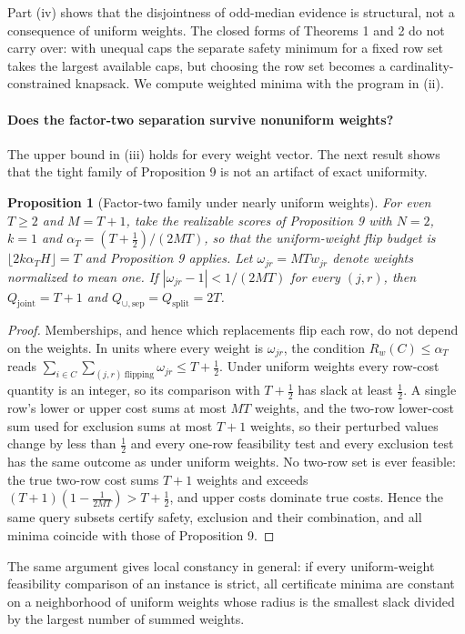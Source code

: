 \documentclass[11pt]{article}
\newtheorem{proposition}{Proposition}
\newcommand{\Qj}{Q_{\mathrm{joint}}}
\newcommand{\Qu}{Q_{\cup,\mathrm{sep}}}
\newcommand{\Qs}{Q_{\mathrm{split}}}
\begin{document}
Part (iv) shows that the disjointness of odd-median evidence is structural, not a consequence of uniform weights. The closed forms of Theorems 1 and 2 do not carry over: with unequal caps the separate safety minimum for a fixed row set takes the largest available caps, but choosing the row set becomes a cardinality-constrained knapsack. We compute weighted minima with the program in (ii).

\paragraph{Does the factor-two separation survive nonuniform weights?} The upper bound in (iii) holds for every weight vector. The next result shows that the tight family of Proposition 9 is not an artifact of exact uniformity.

\begin{proposition}[Factor-two family under nearly uniform weights]
\label{prop:perturb}
For even $T\ge2$ and $M=T+1$, take the realizable scores of Proposition 9 with $N=2$, $k=1$ and $\alpha_T=(T+\frac12)/(2MT)$, so that the uniform-weight flip budget is $\lfloor 2k\alpha_TH\rfloor=T$ and Proposition 9 applies. Let $\omega_{jr}=MTw_{jr}$ denote weights normalized to mean one. If $|\omega_{jr}-1|<1/(2MT)$ for every $(j,r)$, then $\Qj=T+1$ and $\Qu=\Qs=2T$.
\end{proposition}
\begin{proof}
Memberships, and hence which replacements flip each row, do not depend on the weights. In units where every weight is $\omega_{jr}$, the condition $R_w(C)\le\alpha_T$ reads $\sum_{i\in C}\sum_{(j,r)\ \mathrm{flipping}}\omega_{jr}\le T+\frac12$. Under uniform weights every row-cost quantity is an integer, so its comparison with $T+\frac12$ has slack at least $\frac12$. A single row's lower or upper cost sums at most $MT$ weights, and the two-row lower-cost sum used for exclusion sums at most $T+1$ weights, so their perturbed values change by less than $\frac12$ and every one-row feasibility test and every exclusion test has the same outcome as under uniform weights. No two-row set is ever feasible: the true two-row cost sums $T+1$ weights and exceeds $(T+1)(1-\frac1{2MT})>T+\frac12$, and upper costs dominate true costs. Hence the same query subsets certify safety, exclusion and their combination, and all minima coincide with those of Proposition 9.
\end{proof}
The same argument gives local constancy in general: if every uniform-weight feasibility comparison of an instance is strict, all certificate minima are constant on a neighborhood of uniform weights whose radius is the smallest slack divided by the largest number of summed weights.
\end{document}
